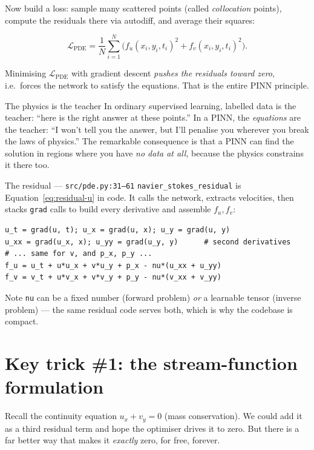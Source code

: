 \documentclass[11pt,a4paper]{article}
\begin{document}
Now build a loss: sample many scattered points (called \emph{collocation}
points), compute the residuals there via autodiff, and average their squares:

\begin{equation}
\mathcal{L}_{\text{PDE}} = \frac{1}{N}\sum_{i=1}^{N}
\Big( f_u(x_i,y_i,t_i)^2 + f_v(x_i,y_i,t_i)^2 \Big).
\label{eq:pde-loss}
\end{equation}

Minimising $\mathcal{L}_{\text{PDE}}$ with gradient descent \emph{pushes the
residuals toward zero}, i.e.\ forces the network to satisfy the equations. That
is the entire PINN principle.

\begin{intuitionbox}{The physics is the teacher}
In ordinary supervised learning, labelled data is the teacher: ``here is the
right answer at these points.'' In a PINN, the \emph{equations} are the teacher:
``I won't tell you the answer, but I'll penalise you wherever you break the laws
of physics.'' The remarkable consequence is that a PINN can find the solution in
regions where you have \emph{no data at all}, because the physics constrains it
there too.
\end{intuitionbox}

\begin{coderef}{The residual --- \texttt{src/pde.py:31--61}}
\texttt{navier\_stokes\_residual} is Equation~\eqref{eq:residual-u} in code. It
calls the network, extracts velocities, then stacks \texttt{grad} calls to build
every derivative and assemble $f_u, f_v$:
\begin{lstlisting}[style=pycode]
u_t = grad(u, t); u_x = grad(u, x); u_y = grad(u, y)
u_xx = grad(u_x, x); u_yy = grad(u_y, y)      # second derivatives
# ... same for v, and p_x, p_y ...
f_u = u_t + u*u_x + v*u_y + p_x - nu*(u_xx + u_yy)
f_v = v_t + u*v_x + v*v_y + p_y - nu*(v_xx + v_yy)
\end{lstlisting}
Note \texttt{nu} can be a fixed number (forward problem) \emph{or} a learnable
tensor (inverse problem) --- the same residual code serves both, which is why
the codebase is compact.
\end{coderef}

\section{Key trick \#1: the stream-function formulation}
\label{sec:stream-function}

Recall the continuity equation $u_x + v_y = 0$ (mass conservation). We could add
it as a third residual term and hope the optimiser drives it to zero. But there
is a far better way that makes it \emph{exactly} zero, for free, forever.
\end{document}
